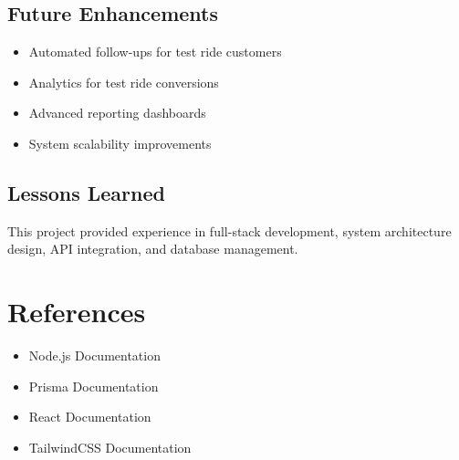 \documentclass[12pt,a4paper]{report}
\begin{document}
\section{Future Enhancements}

\begin{itemize}
\item Automated follow-ups for test ride customers
\item Analytics for test ride conversions
\item Advanced reporting dashboards
\item System scalability improvements
\end{itemize}

\section{Lessons Learned}

This project provided experience in full-stack development, system architecture design, API integration, and database management.

\chapter{References}

\begin{itemize}
\item Node.js Documentation
\item Prisma Documentation
\item React Documentation
\item TailwindCSS Documentation
\end{itemize}
\end{document}
